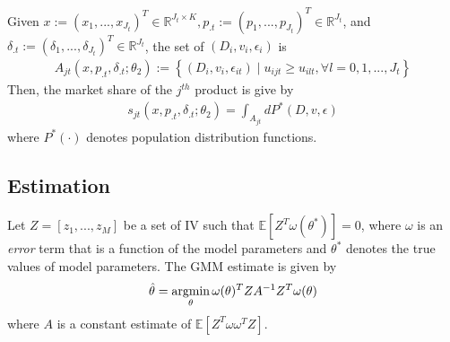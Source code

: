 \documentclass[11pt]{elegantbook}
\newcommand{\argmin}{\operatornamewithlimits{argmin}}
\begin{document}
Given $x:=(x_1,...,x_{J_t})^T\in \mathbb{R}^{J_t\times K}, p_{.t}:=(p_1,...,p_{J_t})^T\in \mathbb{R}^{J_t}$, and $\delta_{.t}:=(\delta_1,...,\delta_{J_t})^T\in \mathbb{R}^{J_t}$, the set of $(D_i,v_i,\epsilon_i)$ is
\begin{equation}
    \begin{aligned}
        A_{jt}\left(x,p_{.t},\delta_{.t};\theta_2\right):=\left\{(D_i,v_i,\epsilon_{it})\mid u_{ijt}\geq u_{ilt},\forall l=0,1,...,J_t\right\}
    \end{aligned}
    \nonumber
\end{equation}
Then, the market share of the $j^{th}$ product is give by
\begin{equation}
    \begin{aligned}
        s_{jt}\left(x,p_{.t},\delta_{.t};\theta_2\right)=\int_{A_{jt}}d P^*(D,v,\epsilon)
    \end{aligned}
    \label{Nevo_2021_(5)}
\end{equation}
where $P^*(\cdot)$ denotes population distribution functions.


\subsection{Estimation}
Let $Z=[z_1,...,z_M]$ be a set of IV such that $\mathbb{E}[Z^T\omega(\theta^*)]=0$, where $\omega$ is an \textit{error} term that is a function of the model parameters and $\theta^*$ denotes the true values of model parameters. The GMM estimate is given by
\begin{equation}
    \begin{aligned}
        \hat{\theta}=\argmin_{\theta}\omega(\theta)^TZA^{-1}Z^T\omega(\theta)
    \end{aligned}
    \label{Nevo_2021_(6)}
\end{equation}
where $A$ is a constant estimate of $\mathbb{E}[Z^T\omega\omega^TZ]$.
\end{document}
